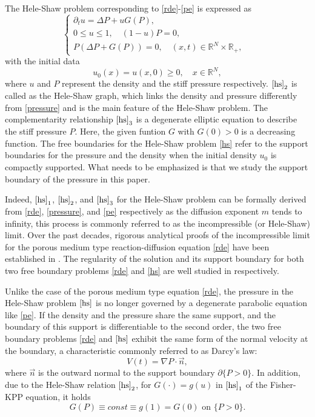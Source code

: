 \documentclass[10pt]{article}         %
\numberwithin{equation}{section}
\begin{document}
The Hele-Shaw problem corresponding to \eqref{rde}-\eqref{pe} is expressed as
\begin{equation}\label{hs}
\begin{cases}
\partial_t u=\Delta P+u G(P),&\\
0\leq u\leq 1,\quad (1-u)P=0,&\\
P(\Delta P+G(P))=0,\quad (x,t)\in\mathbb{R}^N\times \mathbb{R}_+,&
\end{cases}
\end{equation}
with the  initial data
\[u_0(x)=u(x,0)\geq0,\quad x\in\mathbb{R}^N,\]
where $u$ and $P$ represent the density and the stiff pressure respectively. $\eqref{hs}_2$ is called as  the Hele-Shaw graph, which links the density and pressure differently from \eqref{pressure} and is the main feature of the Hele-Shaw problem. The complementarity relationship $\eqref{hs}_3$ is a degenerate elliptic equation to describe the stiff pressure $P$. Here, the given  funtion $G$ with $G(0)>0$ is a decreasing function.  The free boundaries for the Hele-Shaw problem \eqref{hs} refer to the support boundaries  for the pressure and the density when the initial density $u_0$ is compactly supported. What needs to be emphasized is that we study the support boundary of the pressure in this paper.

\vspace{2mm}

Indeed, $\eqref{hs}_1$, $\eqref{hs}_2$, and $\eqref{hs}_3$ for the Hele-Shaw problem can be formally derived from \eqref{rde}, \eqref{pressure}, and \eqref{pe} respectively as the diffusion exponent $m$ tends to infinity, this process is commonly referred to as the incompressible (or Hele-Shaw) limit. Over the past decades, rigorous analytical proofs of the incompressible limit for the porous medium type reaction-diffusion equation \eqref{rde} have been established in \cite{PERTHAME2014,DN2023,KT2018,GKM2022,KM2023,DS2024,JY2024}. The regularity of the solution and its support  boundary for both two free boundary problems \eqref{rde} and \eqref{hs} are well studied in \cite{HQ2024,MELLET2017} respectively. 

\vspace{2mm}

Unlike the case of the porous medium type equation \eqref{rde}, the pressure in the Hele-Shaw problem $\eqref{hs}$ is no longer governed by a degenerate parabolic equation like \eqref{pe}. If the density and the pressure share the same support, and the boundary of this support is differentiable to the second order, the two free boundary problems \eqref{rde} and $\eqref{hs}$ exhibit  the same form of the normal velocity at the boundary, a characteristic commonly referred to as Darcy’s law:
\[V(t)=\nabla P\cdot\vec{n},\]
where $\vec{n}$ is the outward normal to the support boundary 
$\partial\{P>0\}$. In addition, due to the Hele-Shaw relation $\eqref{hs}_2$, for 
$G(\cdot)=g(u)$ in $\eqref{hs}_1$ of the Fisher-KPP equation, it holds
\[G(P)\equiv  const\equiv g(1)=G(0) \text{ on }\{P>0\}.\]
\end{document}
